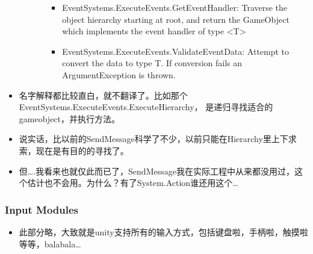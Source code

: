 \documentclass[9pt, b5paper]{article}
\begin{document}
\begin{itemize}
\begin{itemize}
\begin{itemize}
\begin{itemize}
\item EventSystems.ExecuteEvents.GetEventHandler: Traverse the object hierarchy starting at root, and return the GameObject which implements the event handler of type <T>
\item EventSystems.ExecuteEvents.ValidateEventData: Attempt to convert the data to type T. If conversion fails an ArgumentException is thrown.
\end{itemize}
\end{itemize}
\end{itemize}
\item 名字解释都比较直白，就不翻译了。比如那个EventSystems.ExecuteEvents.ExecuteHierarchy， 是递归寻找适合的gameobject，并执行方法。
\item 说实话，比以前的SendMessage科学了不少，以前只能在Hierarchy里上下求索，现在是有目的的寻找了。
\item 但\ldots{}.我看来也就仅此而已了，SendMessage我在实际工程中从来都没用过，这个估计也不会用。为什么？有了System.Action谁还用这个\ldots{}
\end{itemize}
\subsubsection{Input Modules}
\label{sec:org9915742}
\begin{itemize}
\item 此部分略，大致就是unity支持所有的输入方式，包括键盘啦，手柄啦，触摸啦等等，balabala\ldots{}
\end{itemize}
\end{document}
